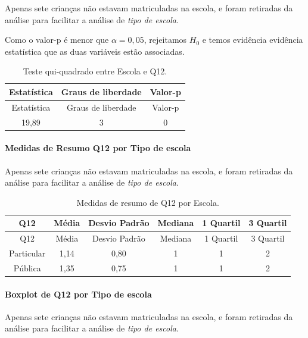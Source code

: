 \documentclass[]{article}
\let\oldparagraph\paragraph
\renewcommand{\paragraph}[1]{\oldparagraph{#1}\mbox{}}
\begin{document}
Apenas sete crianças não estavam matriculadas na escola, e foram retiradas da análise para facilitar a análise de \emph{tipo de escola}.

Como o valor-p é menor que \(\alpha=0,05\), rejeitamos \(H_0\) e temos evidência evidência estatística que as duas variáveis estão associadas.

\begin{longtable}[]{@{}ccc@{}}
\caption{\label{tab:unnamed-chunk-47}Teste qui-quadrado entre Escola e Q12.}\tabularnewline
\toprule
Estatística & Graus de liberdade & Valor-p\tabularnewline
\midrule
\endfirsthead
\toprule
Estatística & Graus de liberdade & Valor-p\tabularnewline
\midrule
\endhead
19,89 & 3 & 0\tabularnewline
\bottomrule
\end{longtable}

\cleardoublepage

\hypertarget{medidas-de-resumo-q12-por-tipo-de-escola}{%
\paragraph{Medidas de Resumo Q12 por Tipo de escola}\label{medidas-de-resumo-q12-por-tipo-de-escola}}

Apenas sete crianças não estavam matriculadas na escola, e foram retiradas da análise para facilitar a análise de \emph{tipo de escola}.

\begin{longtable}[]{@{}cccccc@{}}
\caption{\label{tab:unnamed-chunk-48}Medidas de resumo de Q12 por Escola.}\tabularnewline
\toprule
Q12 & Média & Desvio Padrão & Mediana & 1 Quartil & 3 Quartil\tabularnewline
\midrule
\endfirsthead
\toprule
Q12 & Média & Desvio Padrão & Mediana & 1 Quartil & 3 Quartil\tabularnewline
\midrule
\endhead
Particular & 1,14 & 0,80 & 1 & 1 & 2\tabularnewline
Pública & 1,35 & 0,75 & 1 & 1 & 2\tabularnewline
\bottomrule
\end{longtable}

\hypertarget{boxplot-de-q12-por-tipo-de-escola}{%
\paragraph{Boxplot de Q12 por Tipo de escola}\label{boxplot-de-q12-por-tipo-de-escola}}

Apenas sete crianças não estavam matriculadas na escola, e foram retiradas da análise para facilitar a análise de \emph{tipo de escola}.
\end{document}
